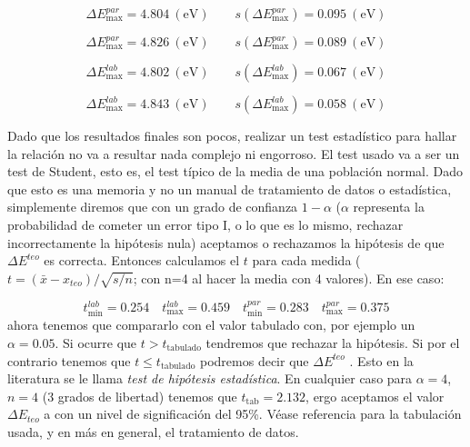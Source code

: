 \documentclass[12pt,a4paper]{article}
\numberwithin{equation}{section}
\numberwithin{figure}{section}
\newcommand{\parentesis}[1]{\left( #1  \right)}
\begin{document}
\begin{equation}
\Delta E_{\max}^{par} = 4.804 \ (\mathrm{eV}) \quad \quad   s\parentesis{\Delta E_{\max}^{par}}= 0.095 \ (\mathrm{eV})
\end{equation} 

\begin{equation}
\Delta E_{\max}^{par} =  4.826  \ (\mathrm{eV}) \quad \quad s\parentesis{\Delta E_{\max}^{par}}=  0.089 \ (\mathrm{eV}) 
\end{equation}

\begin{equation}
\Delta E_{\max}^{lab} = 4.802 \ (\mathrm{eV}) \quad \quad  s\parentesis{\Delta E_{\max}^{lab}}= 0.067 \ (\mathrm{eV}) 
\end{equation} 

\begin{equation} 
\Delta E_{\max}^{lab} =  4.843  \ (\mathrm{eV}) \quad \quad  s\parentesis{\Delta E_{\max}^{lab}}=  0.058 \ (\mathrm{eV}) 
\end{equation}

Dado que los  resultados finales son pocos, realizar un test estadístico para hallar la relación no va a resultar nada complejo ni engorroso. El test usado va a ser un test de Student, esto es, el  test típico de la media de una población normal. Dado que esto es una memoria y no un manual de tratamiento de datos o estadística, simplemente diremos que con un grado de confianza $1-\alpha$ ($\alpha$  representa la probabilidad de cometer un error tipo I, o lo que es lo mismo, rechazar incorrectamente la hipótesis nula) aceptamos o rechazamos la hipótesis de que $\Delta E^{teo}$ es correcta. Entonces calculamos el $t$ para cada medida ($t=(\bar{x}-x_{teo})/\sqrt{s/n}$; con n=4 al hacer la media con 4 valores). En ese caso:

\begin{equation}
t_{\min}^{lab} = 0.254 \quad
t_{\max}^{lab} = 0.459 \quad
t_{\min}^{par} = 0.283 \quad
t_{\max}^{par} = 0.375
\end{equation}
ahora tenemos que compararlo con el valor tabulado con, por ejemplo un $\alpha=0.05$. Si ocurre que $t>t_{\mathrm{tabulado}}$ tendremos que rechazar la hipótesis. Si por el contrario tenemos que $t\leq t_{\mathrm{tabulado}}$ podremos decir que $\Delta E^{teo}$ . Esto en la literatura se le llama \textit{test de hipótesis estadística}. En cualquier caso para $\alpha=4$, $n=4$ (3 grados de libertad) tenemos que $t_{\mathrm{tab}}=2.132$, ergo aceptamos el valor $\Delta E_{teo}$ a con un nivel de significación del 95\%. Véase referencia \cite{libro-1} para la tabulación usada, y en más en general, el tratamiento de datos.  \\
\end{document}
